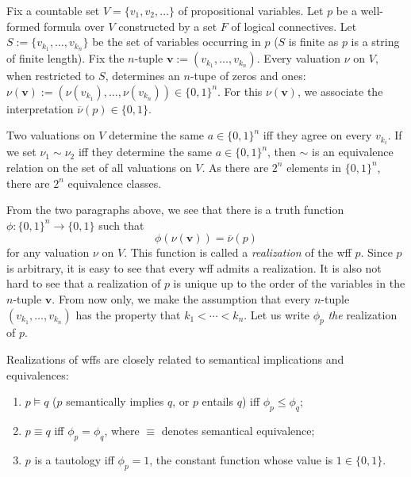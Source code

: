 \documentclass[12pt]{article}
\begin{document}
Fix a countable set $V=\lbrace v_1, v_2, \ldots \rbrace$ of propositional variables.  Let $p$ be a well-formed formula over $V$ constructed by a set $F$ of logical connectives.  Let $S:=\lbrace v_{k_1},\ldots, v_{k_n} \rbrace$ be the set of variables occurring in $p$ ($S$ is finite as $p$ is a string of finite length).  Fix the $n$-tuple $\boldsymbol{v}:=(v_{k_1},\ldots, v_{k_n})$.  Every valuation $\nu$ on $V$, when restricted to $S$, determines an $n$-tupe of zeros and ones: $\nu(\boldsymbol{v}):=(\nu(v_{k_1}),\ldots, \nu(v_{k_n}))\in \lbrace 0,1\rbrace^n$.  For this $\nu(\boldsymbol{v})$, we associate the interpretation $\overline{\nu}(p) \in \lbrace 0,1\rbrace$.

Two valuations on $V$ determine the same $a\in \lbrace 0,1\rbrace^n$ iff they agree on every $v_{k_i}$.  If we set $\nu_1 \sim \nu_2$ iff they determine the same $a\in \lbrace 0,1\rbrace^n$, then $\sim$ is an equivalence relation on the set of all valuations on $V$.  As there are $2^n$ elements in $\lbrace 0,1\rbrace^n$, there are $2^n$ equivalence classes.

From the two paragraphs above, we see that there is a truth function $\phi: \lbrace 0,1\rbrace^n \to \lbrace 0,1\rbrace$ such that $$\phi(\nu(\boldsymbol{v}))=\overline{\nu}(p)$$ for any valuation $\nu$ on $V$.  This function is called a \emph{realization} of the wff $p$.  Since $p$ is arbitrary, it is easy to see that every wff admits a realization.  It is also not hard to see that a realization of $p$ is unique up to the order of the variables in the $n$-tuple $\boldsymbol{v}$.  From now only, we make the assumption that every $n$-tuple $(v_{k_1},\ldots, v_{k_n})$ has the property that $k_1< \cdots <k_n$.  Let us write $\phi_p$ \emph{the} realization of $p$.

Realizations of wffs are closely related to semantical implications and equivalences:
\begin{enumerate}
\item $p \models q$ ($p$ semantically implies $q$, or $p$ entails $q$) iff $\phi_p \le \phi_q$;
\item $p \equiv q$ iff $\phi_p = \phi_q$, where $\equiv$ denotes semantical equivalence;
\item $p$ is a tautology iff $\phi_p=1$, the constant function whose value is $1\in \lbrace 0,1\rbrace$.
\end{enumerate}
\end{document}
